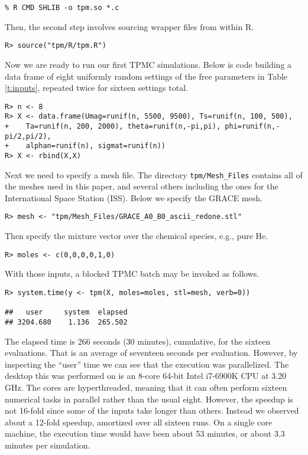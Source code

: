 \documentclass[12pt]{article}
\begin{document}
{\singlespacing
\begin{verbatim}
% R CMD SHLIB -o tpm.so *.c
\end{verbatim}}

\noindent Then, the second step involves sourcing wrapper files from within {\sf R}.

{\singlespacing
\begin{verbatim}
R> source("tpm/R/tpm.R")
\end{verbatim}}

Now we are ready to run our first TPMC simulations.  Below is code building a
data frame of eight uniformly random settings of the free parameters in Table
\ref{t:inputs}, repeated twice for sixteen settings total.

{\singlespacing
\begin{verbatim}
R> n <- 8
R> X <- data.frame(Umag=runif(n, 5500, 9500), Ts=runif(n, 100, 500),
+    Ta=runif(n, 200, 2000), theta=runif(n,-pi,pi), phi=runif(n,-pi/2,pi/2), 
+    alphan=runif(n), sigmat=runif(n))
R> X <- rbind(X,X)
\end{verbatim}}

Next we need to specify a mesh file.  The directory \verb!tpm/Mesh_Files!
contains all of the meshes used in this paper, and several others including
the ones for the International Space Station (ISS).  Below we specify the GRACE mesh.

{\singlespacing
\begin{verbatim}
R> mesh <- "tpm/Mesh_Files/GRACE_A0_B0_ascii_redone.stl"
\end{verbatim}}

\noindent Then specify the mixture vector over the chemical species, e.g.,
pure He.

{\singlespacing
\begin{verbatim}
R> moles <- c(0,0,0,0,1,0)
\end{verbatim}}

With those inputs, a blocked TPMC batch may be invoked as follows.

{\singlespacing
\begin{verbatim}
R> system.time(y <- tpm(X, moles=moles, stl=mesh, verb=0))

##   user     system  elapsed 
## 3204.680    1.136  265.502 
\end{verbatim}}

\noindent The elapsed time is 266 seconds (30 minutes), cumulative, for 
the sixteen evaluations.  That is an average of seventeen seconds per
evaluation. However, by inspecting the ``user'' time we can see that the
execution was parallelized.  The desktop this was performed on is an 8-core
64-bit Intel i7-6900K CPU at 3.20 GHz. The cores are hyperthreaded, meaning
that it can often perform sixteen numerical tasks in parallel rather than the
usual eight. However, the speedup is not 16-fold since some of the inputs
take longer than others.  Instead we observed about a 12-fold speedup,
amortized over all sixteen runs.  On a single core machine, the execution time
would have been about 53 minutes, or about 3.3 minutes per simulation.
\end{document}
